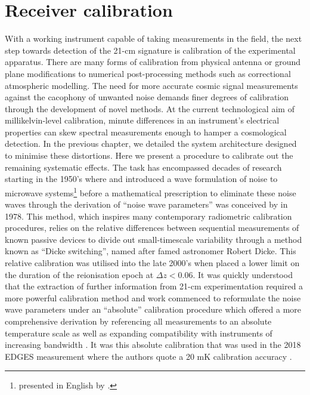 \chapter{Receiver calibration}\label{chap:calibration}

\ifpdf
    \graphicspath{{calibration/figs/Raster/}{calibration/figs/PDF/}{calibration/figs/}}
\else
    \graphicspath{{calibration/figs/Vector/}{calibration/figs/}}
\fi


With a working instrument capable of taking measurements in the field, the next step towards detection of the 21-cm signature is calibration of the experimental apparatus. There are many forms of calibration from physical antenna or ground plane modifications to numerical post-processing methods such as correctional atmospheric modelling. The need for more accurate cosmic signal measurements against the cacophony of unwanted noise demands finer degrees of calibration through the development of novel methods. At the current technological aim of millikelvin-level calibration, minute differences in an instrument’s electrical properties can skew spectral measurements enough to hamper a cosmological detection. In the previous chapter, we detailed the system architecture designed to minimise these distortions. Here we present a procedure to calibrate out the remaining systematic effects. The task has encompassed decades of research starting in the 1950’s where \citet{bauer_rothe} and \citet{rothe_dahlke} introduced a wave formulation of noise to microwave systems\footnote{\citet{bauer_rothe} presented in English by \citet{penfield}.} before a mathematical prescription to eliminate these noise waves through the derivation of “noise wave parameters” was conceived by \citet{meys} in 1978. This method, which inspires many contemporary radiometric calibration procedures, relies on the relative differences between sequential measurements of known passive devices to divide out small-timescale variability through a method known as “Dicke switching”, named after famed astronomer Robert Dicke. This relative calibration was utilised into the late 2000’s when \citet{edges_limits} placed a lower limit on the duration of the reionisation epoch at $\Delta z < 0.06$. It was quickly understood that the extraction of further information from 21-cm experimentation required a more powerful calibration method and work commenced to reformulate the noise wave parameters under an “absolute” calibration procedure which offered a more comprehensive derivation by referencing all measurements to an absolute temperature scale as well as expanding compatibility with instruments of increasing bandwidth \citep{rogersCal}. It was this absolute calibration that was used in the 2018 EDGES measurement where the authors quote a 20 mK calibration accuracy \citep{edgesNature, edgesCal}.


